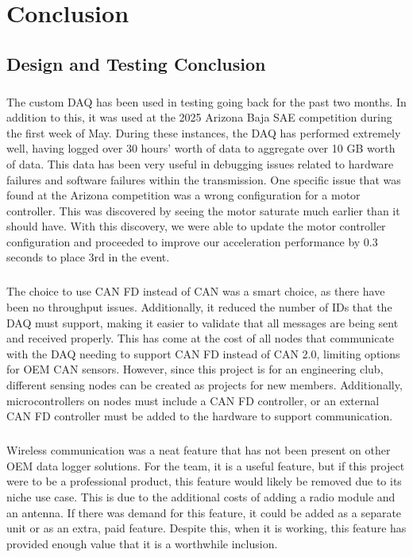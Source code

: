 \chapter{Conclusion}

\section{Design and Testing Conclusion}

\paragraph{}
The custom DAQ has been used in testing going back for the past two months.
In addition to this, it was used at the 2025 Arizona Baja SAE competition \cite{BajaArizonaPage} during the first week of May.
During these instances, the DAQ has performed extremely well, having logged over 30 hours' worth of data to aggregate over 10 GB worth of data.
This data has been very useful in debugging issues related to hardware failures and software failures within the transmission.
One specific issue that was found at the Arizona competition was a wrong configuration for a motor controller.
This was discovered by seeing the motor saturate much earlier than it should have.
With this discovery, we were able to update the motor controller configuration and proceeded to improve our acceleration performance by 0.3 seconds to place 3rd in the event.

\paragraph{}
The choice to use CAN FD instead of CAN was a smart choice, as there have been no throughput issues.
Additionally, it reduced the number of IDs that the DAQ must support, making it easier to validate that all messages are being sent and received properly.
This has come at the cost of all nodes that communicate with the DAQ needing to support CAN FD instead of CAN 2.0, limiting options for OEM CAN sensors.
However, since this project is for an engineering club, different sensing nodes can be created as projects for new members.
Additionally, microcontrollers on nodes must include a CAN FD controller, or an external CAN FD controller must be added to the hardware to support communication.

\paragraph{}
Wireless communication was a neat feature that has not been present on other OEM data logger solutions.
For the team, it is a useful feature, but if this project were to be a professional product, this feature would likely be removed due to its niche use case.
This is due to the additional costs of adding a radio module and an antenna.
If there was demand for this feature, it could be added as a separate unit or as an extra, paid feature.
Despite this, when it is working, this feature has provided enough value that it is a worthwhile inclusion.

